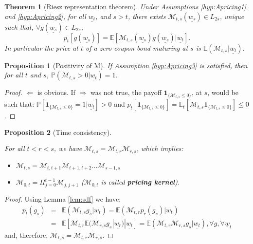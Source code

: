 \documentclass[
  12pt,
]{book}
\providecommand{\tightlist}{%
  \setlength{\itemsep}{0pt}\setlength{\parskip}{0pt}}
\newtheorem{theorem}{Theorem}[chapter]
\newtheorem{proposition}{Proposition}[chapter]
\theoremstyle{definition}
\theoremstyle{definition}
\theoremstyle{definition}
\theoremstyle{definition}
\theoremstyle{remark}
\begin{document}
\begin{theorem}[Riesz representation theorem]
\protect\hypertarget{thm:Riesz}{}\label{thm:Riesz}Under Assumptions \ref{hyp:Apricing1} and \ref{hyp:Apricing2}, for all \(\underline{w_t}\), and \(s > t\), there exists \(\mathcal{M}_{t,s}(\underline{w_s}) \in L_{2s}\), unique such that, \(\forall g(\underline{w_s}) \in L_{2s}\),
\[
p_t[g(\underline{w_s})] = \mathbb{E}[\mathcal{M}_{t,s}(\underline{w_s})g(\underline{w_s})|\underline{w_t}].
\]
In particular the price at \(t\) of a zero coupon bond maturing at \(s\) is \(\mathbb{E}(\mathcal{M}_{t,s}|\underline{w_t})\).
\end{theorem}

\begin{proposition}[Positivity of M]
\protect\hypertarget{prp:PositivityM}{}\label{prp:PositivityM}If Assumption \ref{hyp:Apricing3} is satisfied, then for all \(t\) and \(s\), \(\mathbb{P}(\mathcal{M}_{t,s}>0|\underline{w_t})=1\).
\end{proposition}

\begin{proof}
\(\Leftarrow\) is obvious. If \(\Rightarrow\) was not true, the payoff
\(\textbf{1}_{\{\mathcal{M}_{t,s} \le 0\}}\), at \(s\), would be such that:
\(\mathbb{P}[\textbf{1}_{\{\mathcal{M}_{t,s} \le 0\}}=1|\underline{w_t}] > 0\) and \(p_t[\textbf{1}_{\{\mathcal{M}_{t,s} \le 0\}}] = \mathbb{E}_t[\mathcal{M}_{t,s}\textbf{1}_{\{\mathcal{M}_{t,s} \le 0\}}] \le 0\).
\end{proof}

\begin{proposition}[Time consistency]
\protect\hypertarget{prp:timeconsist}{}\label{prp:timeconsist}

For all \(t < r < s\), we have \(\mathcal{M}_{t,s} = \mathcal{M}_{t,r} \mathcal{M}_{r,s}\), which implies:

\begin{itemize}
\tightlist
\item
  \(\mathcal{M}_{t,s} = \mathcal{M}_{t,t+1} \mathcal{M}_{t+1,t+2}\dots\mathcal{M}_{s-1,s}\)
\item
  \(\mathcal{M}_{0,t} = \Pi^{t-1}_{j=0} \mathcal{M}_{j,j+1}\) (\(\mathcal{M}_{0,t}\) is called \textbf{pricing kernel}).
\end{itemize}

\end{proposition}

\begin{proof}
Using Lemma \ref{lem:sdf} we have:
\begin{eqnarray*}
p_t(g_s) &=& \mathbb{E}(\mathcal{M}_{t,s}g_s|\underline{w_t}) = \mathbb{E}(\mathcal{M}_{t,r} p_r(g_s)|\underline{w_t}) \\
&=& \mathbb{E}[\mathcal{M}_{t,r}\mathbb{E}(\mathcal{M}_{r,s} g_s|\underline{w_r})|\underline{w_t}] = \mathbb{E}(\mathcal{M}_{t,r} \mathcal{M}_{r,s} g_s|\underline{w_t}), \forall g, \forall \underline{w}_{t}
\end{eqnarray*}
and, therefore, \(\mathcal{M}_{t,s} = \mathcal{M}_{t,r}\mathcal{M}_{r,s}\).
\end{proof}
\end{document}
